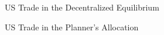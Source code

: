 \documentclass[9pt,pdftex,aspectratio=1610]{beamer}
\theoremstyle{definition}
\begin{document}
\begin{frame}[t]{US Trade in the Decentralized Equilibrium}

\begin{figure}[t]
\end{figure}
\end{frame}

\begin{frame}[t]{US Trade in the Planner's Allocation}

\begin{figure}[t]
\end{figure}
\end{frame}


\end{document}
